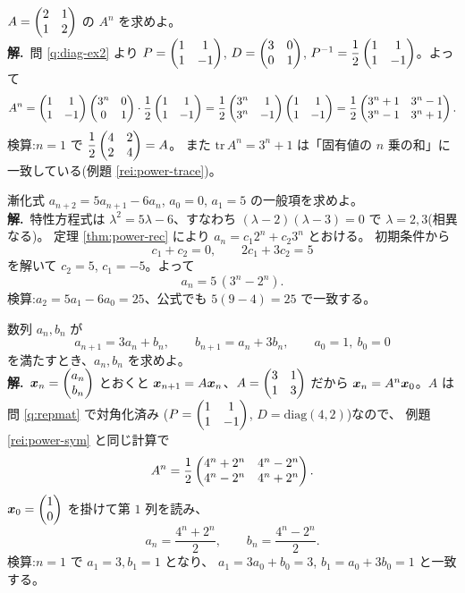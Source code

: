 \begin{rei}[例題・基本(対称行列のべき乗)]\label{rei:power-sym}
$A = \begin{pmatrix}2 & 1 \\ 1 & 2\end{pmatrix}$ の $A^n$ を求めよ。\\
\textbf{解.}\ 問 \ref{q:diag-ex2} より
$P = \begin{pmatrix}1 & 1 \\ 1 & -1\end{pmatrix}$, $D = \begin{pmatrix}3 & 0 \\ 0 & 1\end{pmatrix}$,
$P^{-1} = \dfrac{1}{2}\begin{pmatrix}1 & 1 \\ 1 & -1\end{pmatrix}$。よって
\[
A^n = \begin{pmatrix}1 & 1 \\ 1 & -1\end{pmatrix}\begin{pmatrix}3^n & 0 \\ 0 & 1\end{pmatrix}
\cdot\frac{1}{2}\begin{pmatrix}1 & 1 \\ 1 & -1\end{pmatrix}
= \frac{1}{2}\begin{pmatrix}3^n & 1 \\ 3^n & -1\end{pmatrix}\begin{pmatrix}1 & 1 \\ 1 & -1\end{pmatrix}
= \frac{1}{2}\begin{pmatrix}3^n + 1 & 3^n - 1 \\ 3^n - 1 & 3^n + 1\end{pmatrix}.
\]
検算:$n = 1$ で $\dfrac{1}{2}\begin{pmatrix}4 & 2 \\ 2 & 4\end{pmatrix} = A$。
また $\mathrm{tr}\,A^n = 3^n + 1$ は「固有値の $n$ 乗の和」に
一致している(例題 \ref{rei:power-trace})。
\end{rei}

\begin{rei}[例題・基本(漸化式を解く)]\label{rei:power-rec-ex}
漸化式 $a_{n+2} = 5a_{n+1} - 6a_n$, $a_0 = 0$, $a_1 = 5$ の一般項を求めよ。\\
\textbf{解.}\ 特性方程式は $\lambda^2 = 5\lambda - 6$、すなわち
$(\lambda - 2)(\lambda - 3) = 0$ で $\lambda = 2, 3$(相異なる)。
定理 \ref{thm:power-rec} により $a_n = c_1 2^n + c_2 3^n$ とおける。
初期条件から
\[
c_1 + c_2 = 0, \qquad 2c_1 + 3c_2 = 5
\]
を解いて $c_2 = 5$, $c_1 = -5$。よって
\[
a_n = 5\,(3^n - 2^n).
\]
検算:$a_2 = 5a_1 - 6a_0 = 25$、公式でも $5(9 - 4) = 25$ で一致する。
\end{rei}

\begin{rei}[例題・標準(連立漸化式)]\label{rei:power-system}
数列 $a_n, b_n$ が
\[
a_{n+1} = 3a_n + b_n, \qquad b_{n+1} = a_n + 3b_n, \qquad
a_0 = 1,\ b_0 = 0
\]
を満たすとき、$a_n, b_n$ を求めよ。\\
\textbf{解.}\ $\bm{x}_n = \begin{pmatrix}a_n \\ b_n\end{pmatrix}$ とおくと
$\bm{x}_{n+1} = A\bm{x}_n$、$A = \begin{pmatrix}3 & 1 \\ 1 & 3\end{pmatrix}$ だから
$\bm{x}_n = A^n\bm{x}_0$。$A$ は問 \ref{q:repmat} で対角化済み
($P = \begin{pmatrix}1 & 1 \\ 1 & -1\end{pmatrix}$, $D = \mathrm{diag}(4, 2)$)なので、
例題 \ref{rei:power-sym} と同じ計算で
\[
A^n = \frac{1}{2}\begin{pmatrix}4^n + 2^n & 4^n - 2^n \\ 4^n - 2^n & 4^n + 2^n\end{pmatrix}.
\]
$\bm{x}_0 = \begin{pmatrix}1 \\ 0\end{pmatrix}$ を掛けて第 $1$ 列を読み、
\[
a_n = \frac{4^n + 2^n}{2}, \qquad b_n = \frac{4^n - 2^n}{2}.
\]
検算:$n = 1$ で $a_1 = 3, b_1 = 1$ となり、
$a_1 = 3a_0 + b_0 = 3$, $b_1 = a_0 + 3b_0 = 1$ と一致する。
\end{rei}

